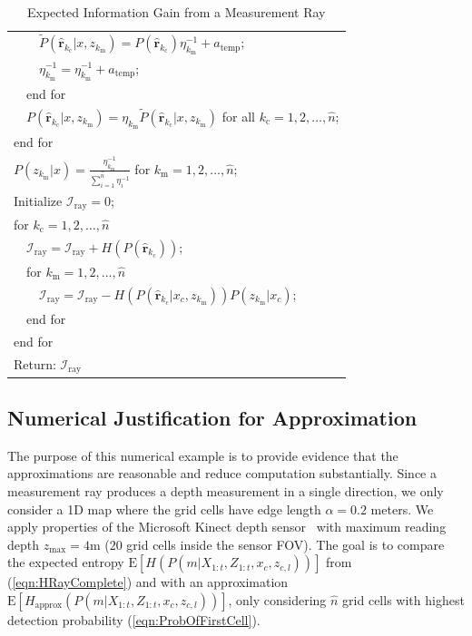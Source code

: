\documentclass[letterpaper, 10pt, conference]{ieeeconf}
\newcommand{\refeqn}[1]{(\ref{eqn:#1})}
\begin{document}
\begin{table}
\begin{tabular}{ l }
   \ \ \ \ $\tilde P(\hat{\mathbf{r}}_{k_\text{c}}|x,z_{k_\text{m}})=P(\hat{\mathbf{r}}_{k_\text{c}})\eta^{-1}_{k_\text{m}}+a_\text{temp}$;\\
   \ \ \ \ $\eta^{-1}_{k_\text{m}}=\eta^{-1}_{k_\text{m}}+a_\text{temp}$;\\
   \ \ end for\\
   \ \ $P(\hat{\mathbf{r}}_{k_\text{c}}|x,z_{k_\text{m}})=\eta_{k_\text{m}}\tilde P(\hat{\mathbf{r}}_{k_\text{c}}|x,z_{k_\text{m}})$ for all $k_\text{c}=1,2,\ldots,\hat n$;\\
   end for\\ 
   $P(z_{k_\text{m}}|x)=\frac{\eta^{-1}_{k_\text{m}}}{\sum_{i=1}^{\hat n}\eta^{-1}_{i}}$ for $k_\text{m}=1,2,\ldots,\hat n$;\\
   
   Initialize $\mathcal I_\text{ray}=0$;\\
   for $k_\text{c}=1,2,\ldots,\hat n$\\
   \ \ $\mathcal I_\text{ray}=\mathcal I_\text{ray}+H(P(\hat{\mathbf{r}}_{k_\text{c}}))$;\\
   \ \ for $k_\text{m}=1,2,\ldots,\hat n$\\
   \ \ \ \ $\mathcal I_\text{ray} = \mathcal I_\text{ray}-H(P(\hat{\mathbf{r}}_{k_\text{c}}|x_c,z_{k_\text{m}}))P(z_{k_\text{m}}|x_{c})$;\\
   \ \ end for\\
  end for\\
  Return: $\mathcal I_\text{ray}$\\
\end{tabular}
\caption{Expected Information Gain from a Measurement Ray}
\label{tab:RayExpectedEntropyGain}
\end{table}



\subsection{Numerical Justification for Approximation}

The purpose of this numerical example is to provide evidence that the approximations are reasonable and reduce computation substantially.
Since a measurement ray produces a depth measurement in a single direction, we only consider a 1D map where the grid cells have edge length $\alpha=0.2$ meters. We apply properties of the Microsoft Kinect depth sensor~\cite{PirRutBisSch11,KhoElb12} with maximum reading depth $z_\text{max}=4$m ($20$ grid cells inside the sensor FOV). The goal is to compare the expected entropy $\text{E}[H(P(m|X_{1:t},Z_{1:t},x_c,z_{c,l}))]$ from \refeqn{HRayComplete} and with an approximation $\text{E}[H_\text{approx}(P(m|X_{1:t},Z_{1:t},x_c,z_{c,l}))]$, only considering $\hat n$ grid cells with highest detection probability \refeqn{ProbOfFirstCell}.
\end{document}
